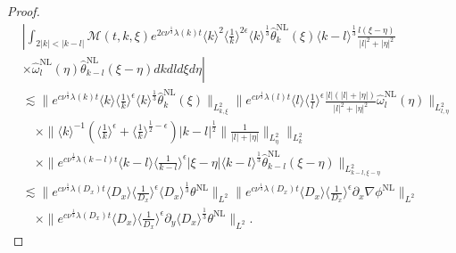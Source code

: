 \documentclass[reqno, 12pt]{amsart} %
\theoremstyle{plain} %
\theoremstyle{definition}
\theoremstyle{remark}
\numberwithin{equation}{section} %
\newcommand{\no}{\nonumber}
\newcommand{\lt}{\left}
\newcommand{\rt}{\right}
\newcommand{\px}{\partial_x}
\newcommand{\py}{\partial_y}
\begin{document}
\begin{proof}
\begin{align}
			&\no \left| \int_{2|k| <|k-l| } \mathcal{M}(t, k, \xi) e^{2 c \nu^{\frac{1}{3}} \lambda(k) t}\langle k\rangle^2\langle\frac{1}{k}\rangle^{2 \epsilon} \langle k \rangle^\frac13\hat{\theta}_k^{\mathrm{NL}}(\xi) \langle k-l \rangle^\frac13  \frac{l(\xi - \eta)}{|l|^2+|\eta|^2}\right. \\
			&\lt. \no \times \hat{\omega}_l^{\mathrm{NL}}(\eta) \hat{\theta}_{k-l}^{\mathrm{NL}}(\xi-\eta) d k d l d \xi d \eta \rt| \\
			&\no \lesssim\|e^{c \nu^{\frac{1}{3}} \lambda(k) t}  \langle k \rangle \langle \frac1k \rangle^\epsilon \langle k \rangle^\frac13  \hat{\theta}_k^{\mathrm{NL}}(\xi)\|_{L_{k, \xi}^2}\|e^{c \nu^{\frac{1}{3}} \lambda(l) t}\langle l\rangle\langle\frac{1}{l}\rangle^\epsilon   \frac{|l|(|l| + |\eta|)}{|l|^2  + |\eta|^2} \hat{\omega}_l^{\mathrm{NL}}(\eta)\|_{L_{l, \eta}^2}         \\
			&\no \quad \times \|\langle k\rangle^{-1}   (\langle \frac1k \rangle^\epsilon  + \langle \frac1k \rangle^{\frac12-\epsilon}) |k-l|^\frac12   \| \frac{1}{|l| + |\eta|} \|_{L_{ \eta}^2} \|_{L_{k}^2}  \\
			&\no \quad \times  \|e^{c \nu^{\frac{1}{3}} \lambda(k-l) t}\langle k-l \rangle  \langle \frac{1}{k-l} \rangle^\epsilon    |\xi - \eta|\langle k-l \rangle ^\frac13  \hat{\theta}_{k-l}^{\mathrm{NL}}(\xi-\eta)\|_{L_{k-l, \xi-\eta}^2} \\
			&\no \lesssim\|e^{c \nu^{\frac{1}{3}} \lambda\left(D_x\right) t}\langle D_x\rangle    \langle \frac{1}{D_x}\rangle^\epsilon  \langle D_x \rangle^{\frac{1}{3}} \theta^{\mathrm{NL}}\|_{L^2} \|e^{c \nu^{\frac{1}{3}} \lambda\left(D_x\right) t}\langle D_x\rangle\langle\frac{1}{D_x}\rangle^\epsilon \px \nabla \phi^{\mathrm{NL}}\|_{L^2} \\
			& \quad \times\|e^{c \nu^{\frac{1}{3}} \lambda\left(D_x\right) t}\langle D_x\rangle\langle\frac{1}{D_x}\rangle^\epsilon \py \langle D_x \rangle^{\frac{1}{3}} \theta^{\mathrm{NL}}\|_{L^2} .
		\end{align}
		
		
		

\end{proof}
\end{document}
